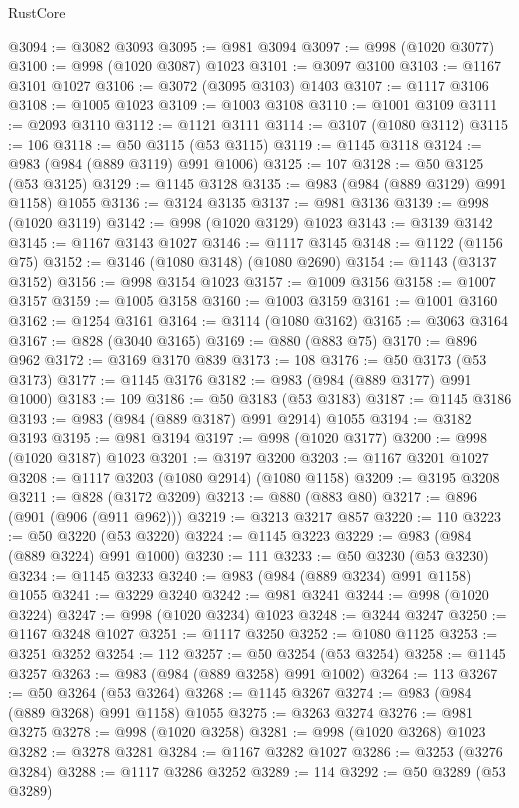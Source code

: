 \begin{lexlean}{RustCore}
\begin{coremodule}
@3094 := @3082 @3093
@3095 := @981 @3094
@3097 := @998 (@1020 @3077)
@3100 := @998 (@1020 @3087) @1023
@3101 := @3097 @3100
@3103 := @1167 @3101 @1027
@3106 := @3072 (@3095 @3103) @1403
@3107 := @1117 @3106
@3108 := @1005 @1023
@3109 := @1003 @3108
@3110 := @1001 @3109
@3111 := @2093 @3110
@3112 := @1121 @3111
@3114 := @3107 (@1080 @3112)
@3115 := 106
@3118 := @50 @3115 (@53 @3115)
@3119 := @1145 @3118
@3124 := @983 (@984 (@889 @3119) @991 @1006)
@3125 := 107
@3128 := @50 @3125 (@53 @3125)
@3129 := @1145 @3128
@3135 := @983 (@984 (@889 @3129) @991 @1158) @1055
@3136 := @3124 @3135
@3137 := @981 @3136
@3139 := @998 (@1020 @3119)
@3142 := @998 (@1020 @3129) @1023
@3143 := @3139 @3142
@3145 := @1167 @3143 @1027
@3146 := @1117 @3145
@3148 := @1122 (@1156 @75)
@3152 := @3146 (@1080 @3148) (@1080 @2690)
@3154 := @1143 (@3137 @3152)
@3156 := @998 @3154 @1023
@3157 := @1009 @3156
@3158 := @1007 @3157
@3159 := @1005 @3158
@3160 := @1003 @3159
@3161 := @1001 @3160
@3162 := @1254 @3161
@3164 := @3114 (@1080 @3162)
@3165 := @3063 @3164
@3167 := @828 (@3040 @3165)
@3169 := @880 (@883 @75)
@3170 := @896 @962
@3172 := @3169 @3170 @839
@3173 := 108
@3176 := @50 @3173 (@53 @3173)
@3177 := @1145 @3176
@3182 := @983 (@984 (@889 @3177) @991 @1000)
@3183 := 109
@3186 := @50 @3183 (@53 @3183)
@3187 := @1145 @3186
@3193 := @983 (@984 (@889 @3187) @991 @2914) @1055
@3194 := @3182 @3193
@3195 := @981 @3194
@3197 := @998 (@1020 @3177)
@3200 := @998 (@1020 @3187) @1023
@3201 := @3197 @3200
@3203 := @1167 @3201 @1027
@3208 := @1117 @3203 (@1080 @2914) (@1080 @1158)
@3209 := @3195 @3208
@3211 := @828 (@3172 @3209)
@3213 := @880 (@883 @80)
@3217 := @896 (@901 (@906 (@911 @962)))
@3219 := @3213 @3217 @857
@3220 := 110
@3223 := @50 @3220 (@53 @3220)
@3224 := @1145 @3223
@3229 := @983 (@984 (@889 @3224) @991 @1000)
@3230 := 111
@3233 := @50 @3230 (@53 @3230)
@3234 := @1145 @3233
@3240 := @983 (@984 (@889 @3234) @991 @1158) @1055
@3241 := @3229 @3240
@3242 := @981 @3241
@3244 := @998 (@1020 @3224)
@3247 := @998 (@1020 @3234) @1023
@3248 := @3244 @3247
@3250 := @1167 @3248 @1027
@3251 := @1117 @3250
@3252 := @1080 @1125
@3253 := @3251 @3252
@3254 := 112
@3257 := @50 @3254 (@53 @3254)
@3258 := @1145 @3257
@3263 := @983 (@984 (@889 @3258) @991 @1002)
@3264 := 113
@3267 := @50 @3264 (@53 @3264)
@3268 := @1145 @3267
@3274 := @983 (@984 (@889 @3268) @991 @1158) @1055
@3275 := @3263 @3274
@3276 := @981 @3275
@3278 := @998 (@1020 @3258)
@3281 := @998 (@1020 @3268) @1023
@3282 := @3278 @3281
@3284 := @1167 @3282 @1027
@3286 := @3253 (@3276 @3284)
@3288 := @1117 @3286 @3252
@3289 := 114
@3292 := @50 @3289 (@53 @3289)

\end{coremodule}
\end{lexlean}
